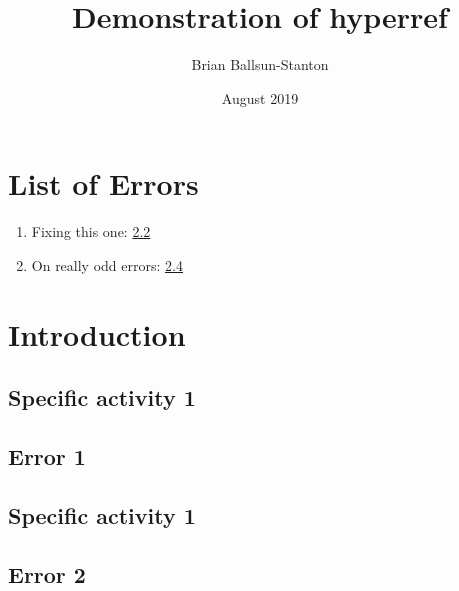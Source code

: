 \documentclass{article}
\title{Demonstration of hyperref}
\author{Brian Ballsun-Stanton}
\date{August 2019}
\begin{document}
\maketitle

\tableofcontents

\section{List of Errors}

\begin{enumerate}
    \item Fixing this one: \ref{error:er1}
    \item On really odd errors: \ref{error:er2}
\end{enumerate}

\section{Introduction}

\lipsum[1]
\subsection{Specific activity 1}
\label{dc:sec1}
\lipsum[1]
\subsection{Error 1}
\label{error:er1}
\lipsum[1]
\subsection{Specific activity 1}
\label{dc:sec1}
\lipsum[1]
\subsection{Error 2}
\label{error:er2}
\lipsum[1]
\end{document}
